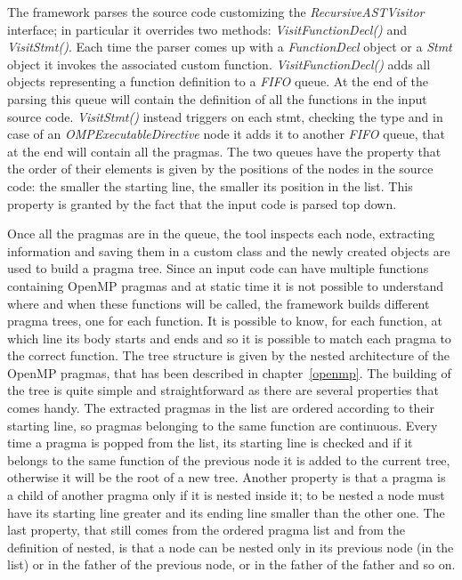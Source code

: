 \documentclass[a4paper,12pt,oneside]{book}
\begin{document}
The framework parses the source code customizing the \emph{RecursiveASTVisitor} interface; in particular it overrides two methods: \emph{VisitFunctionDecl()} and \emph{VisitStmt()}. Each time the parser comes up with a \emph{FunctionDecl} object or a \emph{Stmt} object it invokes the associated custom function. \emph{VisitFunctionDecl()} adds all objects representing a function definition to a \emph{FIFO} queue.  At the end of the parsing this queue will contain the definition of all the functions in the input source code. \emph{VisitStmt()} instead triggers on each stmt, checking the type and in case of an \emph{OMPExecutableDirective} node it adds it to another \emph{FIFO} queue, that at the end will contain all the pragmas. The two queues have the property that the order of their elements is given by the positions of the nodes in the source code: the smaller the starting line, the smaller its position in the list. This property is granted by the fact that the input code is parsed top down.

Once all the pragmas are in the queue, the tool inspects each node, extracting information and saving them in a custom class and the newly created objects are used to build a pragma tree. Since an input code can have multiple functions containing OpenMP pragmas and at static time it is not possible to understand where and when these functions will be called, the framework builds different pragma trees, one for each function. It is possible to know, for each function, at which line its body starts and ends and so it is possible to match each pragma to the correct function. The tree structure is given by the nested architecture of the OpenMP pragmas, that has been described in chapter~\ref{openmp}. The building of the tree is quite simple and straightforward as there are several properties that comes handy. The extracted pragmas in the list are ordered according to their starting line, so pragmas belonging to the same function are continuous. Every time a pragma is popped from the list, its starting line is checked and if it belongs to the same function of the previous node it is added to the current tree, otherwise it will be the root of a new tree. Another property is that a pragma is a child of another pragma only if it is nested inside it; to be nested a node must have its starting line greater and its ending line smaller than the other one.  The last property, that still comes from the ordered pragma list and from the definition of nested, is that a node can be nested only in its previous node (in the list) or in the father of the previous node, or in the father of the father and so on.
\end{document}
